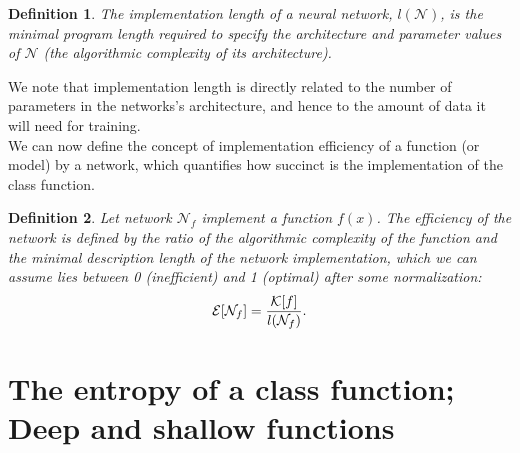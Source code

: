 \documentclass[11pt]{amsart}
\newtheorem{definition}{Definition} %
\begin{document}
\begin{definition}
  The implementation length of a neural network, $l(\mathcal N)$, is the minimal program length required to specify the architecture and parameter values of $\mathcal N$ (the algorithmic complexity of its architecture). 
  \end{definition}
  
  We note that implementation length is directly related to the number of parameters in the networks's architecture, and hence to the amount of data it will need for training. \\

We can now define the concept of implementation efficiency of a function (or model) by a network, which quantifies how succinct is the implementation of the class function. \\

\begin{definition}Let network $\mathcal N_{f}$  implement a function $f(x)$. The  efficiency of the  network is defined by the ratio of the algorithmic complexity of the function and the minimal description length of the network implementation, which we can assume lies between 0 (inefficient) and 1 (optimal) after some normalization:
$$
 \mathcal E[\mathcal N_{f}] = { {\mathcal K}[f] \over l(\mathcal N_f)} 
 .$$
 \end{definition}


\section{The entropy of a class function; Deep and shallow functions}
\end{document}
